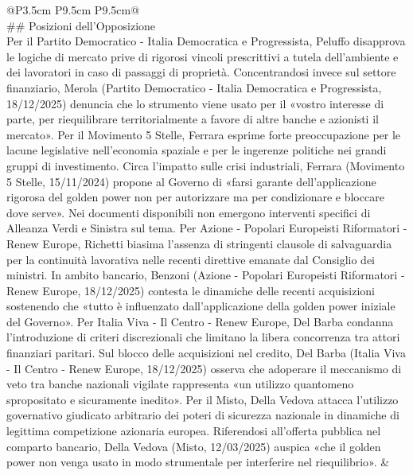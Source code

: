 \documentclass[a4paper,11pt]{article}
\begin{document}
\begin{landscape}
\begin{longtable}{@{}P{3.5cm} P{9.5cm} P{9.5cm}@{}}
\\[6pt] \#\# Posizioni dell'Opposizione\\[6pt] Per il Partito Democratico - Italia Democratica e Progressista, Peluffo disapprova le logiche di mercato prive di rigorosi vincoli prescrittivi a tutela dell'ambiente e dei lavoratori in caso di passaggi di proprietà. Concentrandosi invece sul settore finanziario, Merola (Partito Democratico - Italia Democratica e Progressista, 18/12/2025) denuncia che lo strumento viene usato per il «vostro interesse di parte, per riequilibrare territorialmente a favore di altre banche e azionisti il mercato». Per il Movimento 5 Stelle, Ferrara esprime forte preoccupazione per le lacune legislative nell'economia spaziale e per le ingerenze politiche nei grandi gruppi di investimento. Circa l'impatto sulle crisi industriali, Ferrara (Movimento 5 Stelle, 15/11/2024) propone al Governo di «farsi garante dell'applicazione rigorosa del golden power non per autorizzare ma per condizionare e bloccare dove serve». Nei documenti disponibili non emergono interventi specifici di Alleanza Verdi e Sinistra sul tema. Per Azione - Popolari Europeisti Riformatori - Renew Europe, Richetti biasima l'assenza di stringenti clausole di salvaguardia per la continuità lavorativa nelle recenti direttive emanate dal Consiglio dei ministri. In ambito bancario, Benzoni (Azione - Popolari Europeisti Riformatori - Renew Europe, 18/12/2025) contesta le dinamiche delle recenti acquisizioni sostenendo che «tutto è influenzato dall'applicazione della golden power iniziale del Governo». Per Italia Viva - Il Centro - Renew Europe, Del Barba condanna l'introduzione di criteri discrezionali che limitano la libera concorrenza tra attori finanziari paritari. Sul blocco delle acquisizioni nel credito, Del Barba (Italia Viva - Il Centro - Renew Europe, 18/12/2025) osserva che adoperare il meccanismo di veto tra banche nazionali vigilate rappresenta «un utilizzo quantomeno spropositato e sicuramente inedito». Per il Misto, Della Vedova attacca l'utilizzo governativo giudicato arbitrario dei poteri di sicurezza nazionale in dinamiche di legittima competizione azionaria europea. Riferendosi all'offerta pubblica nel comparto bancario, Della Vedova (Misto, 12/03/2025) auspica «che il golden power non venga usato in modo strumentale per interferire nel riequilibrio». & \\

\end{longtable}
\end{landscape}
\end{document}
